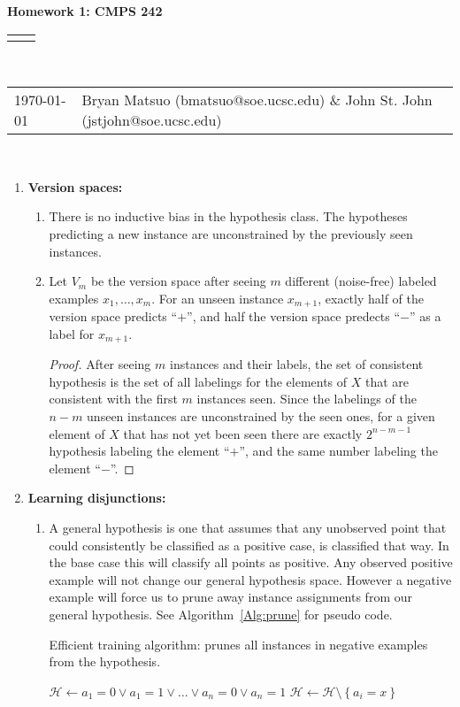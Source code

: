 \documentclass[12pt]{article}
\renewcommand{\title}[1]{\textbf{#1}\\}
\renewcommand{\line}{\begin{tabularx}{\textwidth}{X>{\raggedleft}X}\hline\\\end{tabularx}\\[-0.5cm]}
\newcommand{\leftright}[2]{\begin{tabularx}{\textwidth}{X>{\raggedleft}X}#1%
& #2\\\end{tabularx}\\[-0.5cm]}
\begin{document}
\title{Homework 1: CMPS 242}
\line
\leftright{\today}{Bryan Matsuo (bmatsuo@soe.ucsc.edu) \& John St. John (jstjohn@soe.ucsc.edu)} %
\begin{enumerate}
\item \textbf{Version spaces: }

\begin{enumerate}
\item There is no inductive bias in the hypothesis class. The hypotheses predicting a new instance are unconstrained by the previously seen instances.
\item 
Let $V_m$ be the version space after seeing $m$ different (noise-free) labeled examples $x_1, \dots, x_m$. For an unseen instance $x_{m+1}$, exactly half of the version space predicts ``$+$'', and half the version space predects ``$-$'' as a label for $x_{m+1}$.

\begin{proof}
    After seeing $m$ instances and their labels, the set of consistent hypothesis is the set of all labelings for the elements of $X$ that are consistent with the first $m$ instances seen. Since the labelings of the $n-m$ unseen instances are unconstrained by the seen ones, for a given element of $X$ that has not yet been seen there are exactly $2^{n-m-1}$ hypothesis labeling the element ``$+$'', and the same number labeling the element ``$-$''.
\end{proof}

\end{enumerate}
\item \textbf{ Learning disjunctions: }

\begin{enumerate}
\item A general hypothesis is one that assumes that any unobserved point
that could consistently be classified as a positive case, is classified
that way. In the base case this will classify all points as positive.
Any observed positive example will not change our general hypothesis
space. However a negative example will force us to prune away instance
assignments from our general hypothesis. See Algorithm~\ref{Alg:prune} for pseudo code.
\begin{algorithm}
\caption{Efficient training algorithm: prunes all instances in negative examples from the hypothesis. }
\label{Alg:prune}
\begin{algorithmic}
\STATE $\mathcal{H} \gets a_1=0 \vee a_1=1 \vee \ldots \vee a_n=0 \vee a_n=1$
			\STATE $\mathcal{H} \gets \mathcal{H} \setminus \left\{a_i=x\right\}$
		\ENDFOR
	\ENDIF
\ENDFOR
\end{algorithmic}
\end{algorithm}


\end{enumerate}
\end{enumerate}
\end{document}
